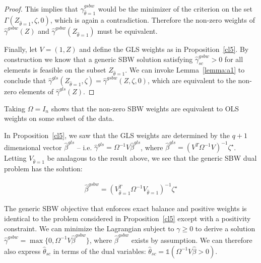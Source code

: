 \begin{proof}
This implies that $\hat{\gamma}^{gsbw}_{\hat{\theta} = 1}$ would be the minimizer of the criterion on the set $\Gamma(Z_{\hat{\theta} = 1}, \zeta, 0)$, which is again a contradiction. Therefore the non-zero weights of $\hat{\gamma}^{gsbw}(Z)$ and $\hat{\gamma}^{gsbw}(Z_{\hat{\theta} =1})$ must be equivalent.

Finally, let $V = (1, Z)$ and define the GLS weights as in Proposition~\ref{cl5}. By construction we know that a generic SBW solution satisfying $\hat{\gamma}_{sc}^{gsbw} > 0$ for all elements is feasible on the subset $Z_{\hat{\theta} = 1}$. We can invoke Lemma~\ref{lemma:a1} to conclude that $\hat{\gamma}^{gls}(Z_{\hat{\theta} = 1}, \zeta) = \hat{\gamma}^{gsbw}(Z, \zeta, 0)$, which are equivalent to the non-zero elements of $\hat{\gamma}^{gls}(Z)$. 
\end{proof}

\begin{remark}
    Taking $\Omega = I_n$ shows that the non-zero SBW weights are equivalent to OLS weights on some subset of the data. 
\end{remark}

\begin{remark}
    In Proposition~\ref{cl5}, we saw that the GLS weights are determined by the $q + 1$ dimensional vector $\hat{\beta}^{gls}$ -- i.e. $\hat{\gamma}^{gls} = \Omega^{-1}V\hat{\beta}^{gls}$, where $\hat{\beta}^{gls} = (V^T\Omega^{-1}V)^{-1}\zeta^\star$. Letting $V_{\hat{\theta}=1}$ be analagous to the result above, we see that the generic SBW dual problem has the solution:
    
    \begin{align}
    \hat{\beta}^{gsbw} = (V_{\hat{\theta}=1}^T\Omega^{-1}V_{\hat{\theta}=1})^{-1}\zeta^\star
    \end{align}
\end{remark}

\begin{remark}
    The generic SBW objective that enforces exact balance and positive weights is identical to the problem considered in Proposition~\ref{cl5} except with a positivity constraint. We can minimize the Lagrangian subject to $\gamma \ge 0$ to derive a solution $\hat{\gamma}^{gsbw} = \max\{0, \Omega^{-1}V\hat{\beta}^{gsbw}\}$, where $\hat{\beta}^{gsbw}$ exists by assumption. We can therefore also express $\hat{\theta}_{sc}$ in terms of the dual variables: $\hat{\theta}_{sc} = \mathds{1}(\Omega^{-1}V\hat{\beta} > 0)$.
\end{remark}

